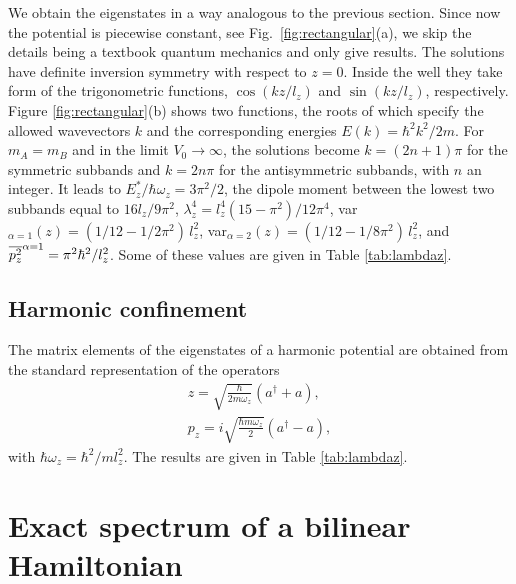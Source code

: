 \documentclass[aps,floatfix,twocolumn,showpacs,10pt,nofootinbib]{revtex4-1}
\begin{document}
We obtain the eigenstates in a way analogous to the previous section. Since now the potential is piecewise constant, see Fig.~\ref{fig:rectangular}(a), we skip the details being a textbook quantum mechanics and only give results. The solutions have definite inversion symmetry with respect to $z=0$. Inside the well they take form of the trigonometric functions, $\cos(k z /l_z)$ and $\sin(k z /l_z)$, respectively. Figure \ref{fig:rectangular}(b) shows two functions, the roots of which specify the allowed wavevectors $k$ and the corresponding energies $E(k)=\hbar^2 k^2/2m$. For $m_A=m_B$ and in the limit $V_0 \to \infty$, the solutions become $k=(2n+1)\pi$ for the symmetric subbands and $k=2n \pi$ for the antisymmetric subbands, with $n$ an integer. It leads to $E_z^*/\hbar \omega_z = 3\pi^2/2$, the dipole moment between the lowest two subbands equal to $16 l_z /9 \pi^2$,
$\lambda_z^4 = l_z^4(15-\pi^2)/12\pi^4$, var$_{\alpha=1}(z) = (1/12-1/2\pi^2)\, l_z^2$, var$_{\alpha=2}(z)=(1/12-1/8\pi^2)\, l_z^2$, and $\overline{p_z^2}^{\alpha=1} = \pi^2 \hbar^2/l_z^2$. Some of these values are given in Table \ref{tab:lambdaz}.

\subsection{Harmonic confinement}

The matrix elements of the eigenstates of a harmonic potential are obtained from the standard representation of the operators
\begin{subequations}
\begin{eqnarray}
z = \sqrt{\frac{\hbar}{2 m \omega_z}} (a^\dagger +a),\\
p_z = i\sqrt{\frac{\hbar m \omega_z}{2 }} (a^\dagger -a),
\end{eqnarray}
\end{subequations}
with $\hbar \omega_z = \hbar^2/m l_z^2$. The results are given in Table \ref{tab:lambdaz}.

\section{Exact spectrum of a bilinear Hamiltonian}

\label{app:exact}
\end{document}
